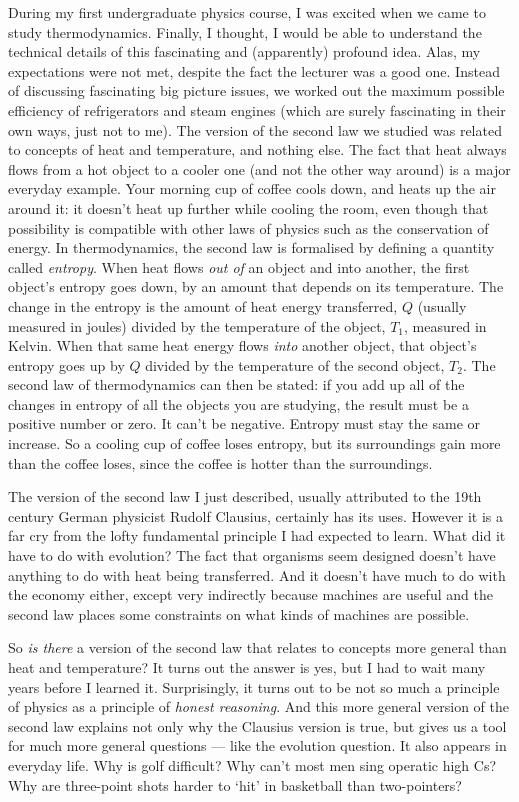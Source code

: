 \documentclass[a4paper, 12pt]{article}
\begin{document}
During my first undergraduate physics course, I was excited when we came to
study thermodynamics. Finally, I thought, I would be able to understand the
technical details of this fascinating and (apparently) profound idea.
Alas, my expectations were not met, despite the fact the lecturer was a
good one.
Instead of discussing fascinating big picture issues, we
worked out the maximum possible efficiency of refrigerators and steam engines
(which are surely fascinating in their own ways, just not to me).
The version of the second law we studied was related to concepts of heat
and temperature, and nothing else.
The fact that heat always flows from a hot object to a cooler
one (and not the other way around) is a major everyday example. Your morning
cup of coffee cools down, and heats up the air around it: it doesn't heat
up further while cooling the room, even though that possibility is compatible
with other laws of physics such as the conservation of energy.
In thermodynamics, the second law is formalised by defining a quantity called
{\em entropy}. When heat flows {\em out of} an object and into another,
the first object's entropy goes
down, by an amount that depends on its temperature.
The change in the entropy is the amount of heat energy transferred,
$Q$ (usually measured in joules)
divided by the temperature of the object, $T_1$, measured in Kelvin.
When that same heat energy flows {\em into} another object, that object's
entropy goes up by $Q$ divided by the temperature of the
second object, $T_2$. The second law of thermodynamics can then be stated: if you
add up all of the changes in entropy of all the objects you are studying,
the result must be a positive number or zero. It can't be negative.
Entropy must stay the same or increase.
So a cooling cup of coffee loses entropy, but its surroundings gain more than
the coffee loses, since the coffee is hotter than the surroundings.

The version of
the second law I just described, usually attributed to the 19th century
German physicist Rudolf Clausius, certainly has its uses. However it is a far
cry from the lofty fundamental principle I had expected to learn. What did it
have to do with evolution? The fact that organisms seem designed doesn't have
anything to do with heat being transferred. And it doesn't have much to do
with the economy either, except very indirectly because machines are useful
and the second law places some constraints on what kinds of machines are
possible.

So {\em is there} a version of the second law that relates to concepts more
general than heat and temperature?
It turns out the answer is yes, but I had to wait many years before I learned it.
Surprisingly, it turns out to be not so much a principle of physics as a
principle of {\em honest reasoning}. And this more general version of the
second law explains not only why the Clausius version is true, but gives us
a tool for much more general questions --- like the evolution question.
It also appears in everyday life.
Why is golf difficult? Why can't most men sing operatic high Cs?
Why are three-point shots harder to `hit' in basketball than two-pointers?
\end{document}

